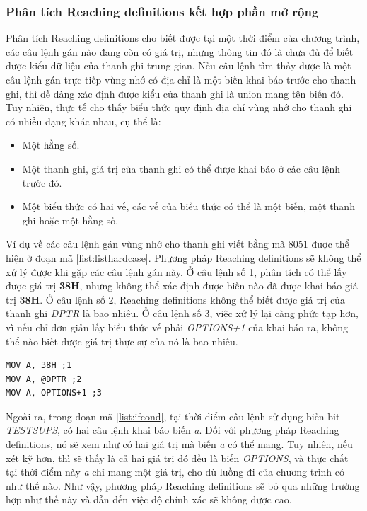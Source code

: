 \subsubsection{Phân tích Reaching definitions kết hợp phần mở rộng}
Phân tích Reaching definitions cho biết được tại một thời điểm của chương trình, các câu lệnh gán nào đang còn có giá trị, nhưng thông tin đó là chưa đủ để biết được kiểu dữ liệu của thanh ghi trung gian. Nếu câu lệnh tìm thấy được là một câu lệnh gán trực tiếp vùng nhớ có địa chỉ là một biến khai báo trước cho thanh ghi, thì dễ dàng xác định được kiểu của thanh ghi là union mang tên biến đó. Tuy nhiên, thực tế cho thấy biểu thức quy định địa chỉ vùng nhớ cho thanh ghi có nhiều dạng khác nhau, cụ thể là:
\begin{itemize}
		\item Một hằng số.
	\item Một thanh ghi, giá trị của thanh ghi có thể được khai báo ở các câu lệnh trước đó.
	\item Một biểu thức có hai vế, các vế của biểu thức có thể là một biến, một thanh ghi hoặc một hằng số.
\end{itemize}
Ví dụ về các câu lệnh gán vùng nhớ cho thanh ghi viết bằng mã 8051 được thể hiện ở đoạn mã \ref{list:listhardcase}. Phương pháp Reaching definitions sẽ không thể xử lý được khi gặp các câu lệnh gán này. Ở câu lệnh số 1, phân tích có thể lấy được giá trị \textbf{38H}, nhưng không thể xác định được biến nào đã được khai báo giá trị \textbf{38H}. Ở câu lệnh số 2, Reaching definitions không thể biết được giá trị của thanh ghi \textit{DPTR} là bao nhiêu. Ở câu lệnh số 3, việc xử lý lại càng phức tạp hơn, vì nếu chỉ đơn giản lấy biểu thức vế phải \textit{OPTIONS+1} của khai báo ra, không thể nào biết được giá trị thực sự của nó là bao nhiêu. \\
\begin{lstlisting}[caption={Một số câu lệnh gán trên 8051 mà Reaching definitions không xử lý được},label={list:listhardcase}]
MOV A, 38H ;1
MOV A, @DPTR ;2
MOV A, OPTIONS+1 ;3
\end{lstlisting}
Ngoài ra, trong đoạn mã \ref{list:ifcond}, tại thời điểm câu lệnh sử dụng biến bit \textit{TESTSUPS}, có hai câu lệnh khai báo biến \textit{a}. Đối với phương pháp Reaching definitions, nó sẽ xem như có hai giá trị mà biến \textit{a} có thể mang. Tuy nhiên, nếu xét kỹ hơn, thì sẽ thấy là cả hai giá trị đó đều là biến \textit{OPTIONS}, và thực chất tại thời điểm này \textit{a} chỉ mang một giá trị, cho dù luồng đi của chương trình có như thế nào. Như vậy, phương pháp Reaching definitions sẽ bỏ qua những trường hợp như thế này và dẫn đến việc độ chính xác sẽ không được cao.
